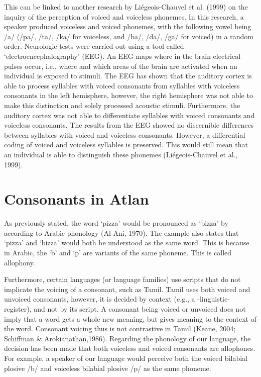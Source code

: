 This can be linked to another research by Liégeois-Chauvel et al. (1999) on the inquiry of the perception of voiced and voiceless phonemes. In this research, a speaker produced voiceless and voiced phonemes, with the following vowel being /a/ (/pa/, /ta/, /ka/ for voiceless, and /ba/, /da/, /ga/ for voiced) in a random order. Neurologic tests were carried out using a tool called ‘electroencephalography’ (EEG). An EEG maps where in the brain electrical pulses occur, i.e., where and which areas of the brain are activated when an individual is exposed to stimuli. The EEG has shown that the auditory cortex is able to process syllables with voiced consonants from syllables with voiceless consonants in the left hemisphere, however, the right hemisphere was not able to make this distinction and solely processed acoustic stimuli. Furthermore, the auditory cortex was not able to differentiate syllables with voiced consonants and voiceless consonants. The results from the EEG showed no discernible differences between syllables with voiced and voiceless consonants. However, a differential coding of voiced and voiceless syllables is preserved. This would still mean that an individual is able to distinguish these phonemes (Liégeois-Chauvel et al., 1999).

\vspace{-0.2cm}
\section{Consonants in Atlan}
As previously stated, the word ‘pizza’ would be pronounced as ‘bizza’ by according to Arabic phonology (Al-Ani, 1970). The example also states that ‘pizza’ and ‘bizza’ would both be understood as the same word. This is because in Arabic, the ‘b’ and ‘p’ are variants of the same phoneme. This is called allophony. 

Furthermore, certain languages (or language families) use scripts that do not implicate the voicing of a consonant, such as Tamil. Tamil uses both voiced and unvoiced consonants, however, it is decided by context (e.g., a -linguistic- register), and not by its script. A consonant being voiced or unvoiced does not imply that a word gets a whole new meaning, but gives meaning to the context of the word. Consonant voicing thus is not contrastive in Tamil (Keane, 2004; Schiffman \& Arokianathan,1986). Regarding the phonology of our language, the decision has been made that both voiceless and voiced consonants are allophones. For example, a speaker of our language would perceive both the voiced bilabial plosive /b/ and voiceless bilabial plosive /p/ as the same phoneme.  

